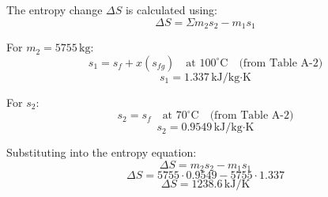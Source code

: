 The entropy change \( \Delta S \) is calculated using:  
\[
\Delta S = \Sigma m_2 s_2 - m_1 s_1
\]  

For \( m_2 = 5755 \, \text{kg} \):  
\[
s_1 = s_f + x (s_{fg}) \quad \text{at } 100^\circ\text{C} \quad \text{(from Table A-2)}
\]  
\[
s_1 = 1.337 \, \text{kJ/kg·K}
\]  

For \( s_2 \):  
\[
s_2 = s_f \quad \text{at } 70^\circ\text{C} \quad \text{(from Table A-2)}
\]  
\[
s_2 = 0.9549 \, \text{kJ/kg·K}
\]  

Substituting into the entropy equation:  
\[
\Delta S = m_2 s_2 - m_1 s_1
\]  
\[
\Delta S = 5755 \cdot 0.9549 - 5755 \cdot 1.337
\]  
\[
\Delta S = 1238.6 \, \text{kJ/K}
\]